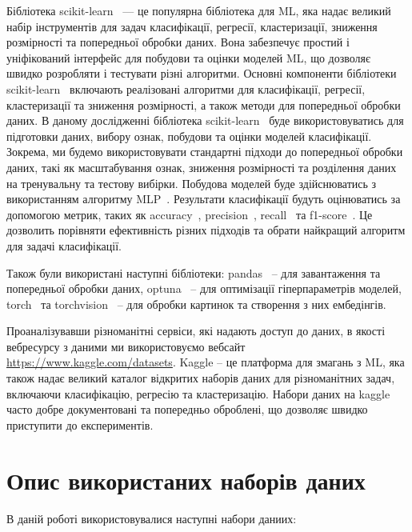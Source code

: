 Бібліотека scikit-learn~\cite{ct20} --- це популярна бібліотека для ML, яка надає великий набір інструментів для задач класифікації, регресії, кластеризації, зниження розмірності та попередньої обробки даних. Вона забезпечує простий і уніфікований інтерфейс для побудови та оцінки моделей ML, що дозволяє швидко розробляти і тестувати різні алгоритми. Основні компоненти бібліотеки scikit-learn~\cite{ct20} включають реалізовані алгоритми для класифікації, регресії, кластеризації та зниження розмірності, а також методи для попередньої обробки даних. В даному дослідженні бібліотека scikit-learn~\cite{ct20} буде використовуватись для підготовки даних, вибору ознак, побудови та оцінки моделей класифікації. Зокрема, ми будемо використовувати стандартні підходи до попередньої обробки даних, такі як масштабування ознак, зниження розмірності та розділення даних на тренувальну та тестову вибірки. Побудова моделей буде здійснюватись з використанням алгоритму MLP~\cite{ct26}. Результати класифікації будуть оцінюватись за допомогою метрик, таких як accuracy~\cite{ct6}, precision~\cite{ct6}, recall~\cite{ct7} та f1-score~\cite{ct8}. Це дозволить порівняти ефективність різних підходів та обрати найкращий алгоритм для задачі класифікації.

Також були використані наступні бібліотеки: pandas~\cite{ct21} -- для завантаження та попередньої обробки даних, optuna~\cite{ct22} -- для оптимізації гіперпараметрів моделей, torch~\cite{ct23} та torchvision~\cite{ct24} -- для обробки картинок та створення з них ембедінгів.

Проаналізувавши різноманітні сервіси, які надають доступ до даних, в якості вебресурсу з даними ми використовуємо вебсайт \href{https://www.kaggle.com/datasets}{https://www.kaggle.com/datasets}. Kaggle -- це платформа для змагань з ML, яка також надає великий каталог відкритих наборів даних для різноманітних задач, включаючи класифікацію, регресію та кластеризацію. Набори даних на kaggle часто добре документовані та попередньо оброблені, що дозволяє швидко приступити до експериментів.

\section{Опис використаних наборів даних} \label{sec:data-description}

В даній роботі використовувалися наступні набори даниих: 

